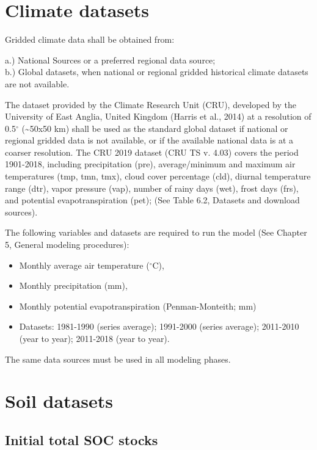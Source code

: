 \documentclass[
  10pt,
  b5paper,
]{book}
\providecommand{\tightlist}{%
  \setlength{\itemsep}{0pt}\setlength{\parskip}{0pt}}
\begin{document}
\hypertarget{climate-datasets}{%
\section{Climate datasets}\label{climate-datasets}}

Gridded climate data shall be obtained from:

a.) National Sources or a preferred regional data source;\\
b.) Global datasets, when national or regional gridded historical climate datasets are not available.

The dataset provided by the Climate Research Unit (CRU), developed by the University of East Anglia, United Kingdom (Harris et al., 2014) at a resolution of 0.5\(^\circ\) (\textasciitilde50x50 km) shall be used as the standard global dataset if national or regional gridded data is not available, or if the available national data is at a coarser resolution. The CRU 2019 dataset (CRU TS v. 4.03) covers the period 1901-2018, including precipitation (pre), average/minimum and maximum air temperatures (tmp, tmn, tmx), cloud cover percentage (cld), diurnal temperature range (dtr), vapor pressure (vap), number of rainy days (wet), frost days (frs), and potential evapotranspiration (pet); (See Table 6.2, Datasets and download sources).

The following variables and datasets are required to run the model (See Chapter 5, General modeling procedures):

\begin{itemize}
\tightlist
\item
  Monthly average air temperature (\(^\circ\)C),
\item
  Monthly precipitation (mm),
\item
  Monthly potential evapotranspiration (Penman-Monteith; mm)
\item
  Datasets: 1981-1990 (series average); 1991-2000 (series average); 2011-2010 (year to year); 2011-2018 (year to year).
\end{itemize}

The same data sources must be used in all modeling phases.

\hypertarget{soil-datasets}{%
\section{Soil datasets}\label{soil-datasets}}

\hypertarget{initial-total-soc-stocks}{%
\subsection{Initial total SOC stocks}\label{initial-total-soc-stocks}}
\end{document}

